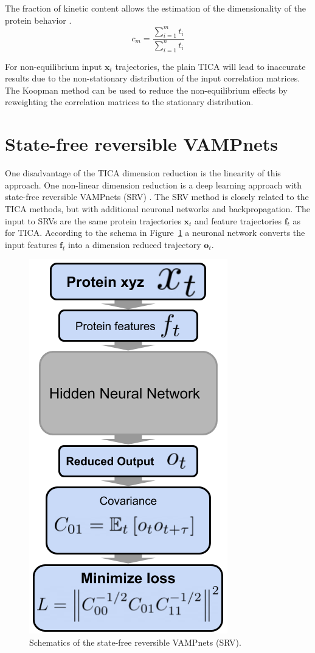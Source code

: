 The fraction of kinetic content allows the estimation of the dimensionality of the protein behavior \cite{noe2016commute}.
$$c_{m}=\frac{\sum_{i=1}^{m}t_{i}}{\sum_{i=1}^{n}t_{i}}$$

For non-equilibrium input $\mathbf{x}_{t}$ trajectories, the plain TICA will lead to inaccurate results due to the non-stationary distribution of the input correlation matrices. The Koopman method \cite{koopmanold,
koopman2,koopman3,koopman4, wu2017variational, Nueske2017} can be used to reduce
the non-equilibrium effects by reweighting the correlation matrices to the stationary distribution.

\section{State-free reversible VAMPnets}

One disadvantage of the TICA dimension reduction is the linearity of this approach. One non-linear dimension reduction is a deep learning approach with state-free reversible VAMPnets (SRV) \cite{Mardt2018,chen2019jcp}. The SRV method is closely related to the TICA methods, but with additional neuronal networks and backpropagation. The input to SRVs are the same protein trajectories $\mathbf{x}_{t}$ and feature trajectories $\mathbf{f}_{t}$ as for TICA. According to the schema in Figure~\ref{fig:NN} a neuronal network converts the input features $\mathbf{f}_{t}$ into a dimension reduced trajectory $\mathbf{o}_{t}$.

\begin{figure}[H]
  \centering
  \includegraphics[width=0.4\linewidth]{figures3/NN.png}
  \caption{Schematics of the state-free reversible VAMPnets (SRV).}
  \label{fig:NN}
\end{figure}


